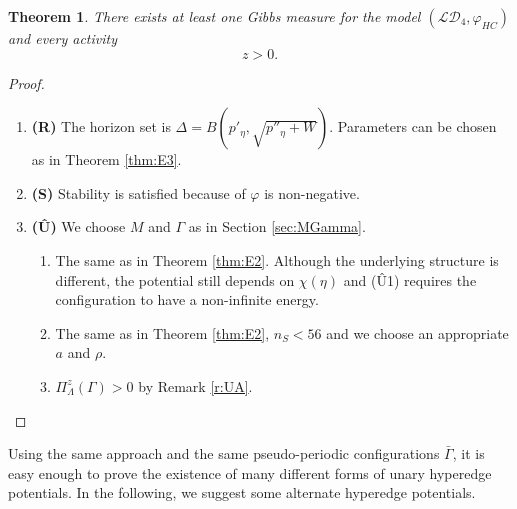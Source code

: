 \documentclass{kybernetika}
\newtheorem{theorem}{Theorem}[section]
\begin{document}
\begin{theorem}\label{thm:E4}
	There exists at least one Gibbs measure for the model $(\mathcal {LD}_4,\varphi_{HC})$ and every activity $$z>0.$$
\end{theorem}
\begin{proof}
\begin{enumerate}[]
	\item \textbf{(R)} The horizon set is $\Delta = B(p'_\eta,\sqrt{p''_\eta +W})$. Parameters can be chosen as in Theorem \ref{thm:E3}. 
	\item \textbf{(S)} Stability is satisfied because of $\varphi$ is non-negative.
	\item \textbf{(\^U)} We choose $M$ and $\Gamma$ as in Section \ref{sec:MGamma}.
		\begin{enumerate}[(U1)]
			\item The same as in Theorem \ref{thm:E2}. Although the underlying structure is different, the potential still depends on $\chi(\eta)$ and (\^U1) requires the configuration to have a non-infinite energy.
			\item The same as in Theorem \ref{thm:E2}, $n_S<56$ and we choose an appropriate $a$ and $\rho$.
			\item $\Pi^z_\Lambda(\Gamma)>0$ by Remark \ref{r:UA}.
		\end{enumerate}
\end{enumerate}
\end{proof}



Using the same approach and the same pseudo-periodic configurations $\bar\Gamma$, it is easy enough to prove the existence of many different forms of unary hyperedge potentials. In the following, we suggest some alternate hyperedge potentials. 
\end{document}

